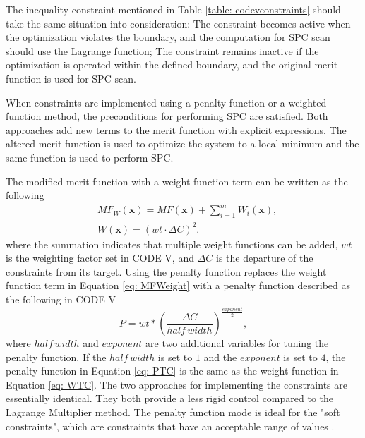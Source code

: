 The inequality constraint mentioned in Table \ref{table: codevconstraints} should take the same situation into consideration: The constraint becomes active when the optimization violates the boundary, and the computation for SPC scan should use the Lagrange function; The constraint remains inactive if the optimization is operated within the defined boundary, and the original merit function is used for SPC scan. 

When constraints are implemented using a penalty function or a weighted function method, the preconditions for performing SPC are satisfied. Both approaches add new terms to the merit function with explicit expressions. The altered merit function is used to optimize the system to a local minimum and the same function is used to perform SPC. 

The modified merit function with a weight function term can be written as the following 
\setlength{\belowdisplayshortskip}{5pt}
\setlength{\abovedisplayshortskip}{5pt}
\begin{subequations} 
\begin{align}
& MF_{W}(\textbf{x})=MF(\textbf{x})+\sum_{i=1}^{m}W_i(\textbf{x}), \label{eq: MFWeight} \\
& W(\textbf{x})=(wt\cdot \Delta C)^2. \label{eq: WTC}
\end{align}
\end{subequations}
where the summation indicates that multiple weight functions can be added, $wt$ is the weighting factor set in CODE V, and $\Delta C$ is the departure of the constraints from its target. Using the penalty function replaces the weight function term in Equation \ref{eq: MFWeight} with a penalty function described as the following in CODE V
\setlength{\belowdisplayshortskip}{5pt}
\setlength{\abovedisplayshortskip}{5pt}
\begin{equation} \label{eq: PTC}
P = wt*(\frac{\Delta C}{half \, width})^{\frac{exponent}{2}},
\end{equation}where ${half \, width}$ and $exponent$ are two additional variables for tuning the penalty function. If the ${half \, width}$ is set to $1$ and the $exponent$ is set to $4$, the penalty function in Equation \ref{eq: PTC} is the same as the weight function in Equation \ref{eq: WTC}. The two approaches for implementing the constraints are essentially identical. They both provide a less rigid control compared to the Lagrange Multiplier method. The penalty function mode is ideal for the "soft constraints", which are constraints that have an acceptable range of values \cite{codevmanual}. 


